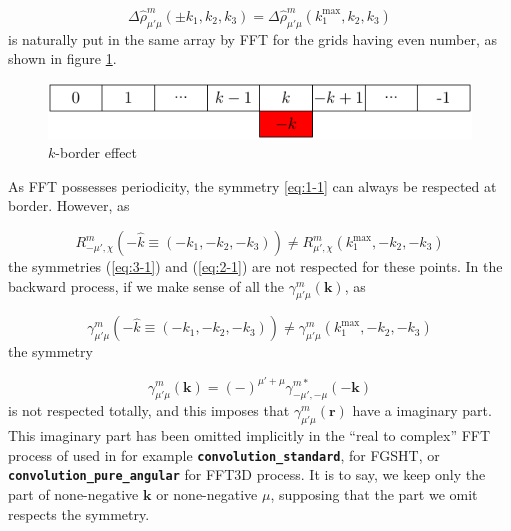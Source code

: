 \[
\Delta\hat{\rho}_{\mu'\mu}^{m}(\pm k_{1},k_{2},k_{3})=\Delta\hat{\rho}_{\mu'\mu}^{m}(k_{1}^{\mathrm{max}},k_{2},k_{3})
\]
is naturally put in the same array by FFT for the grids having even
number, as shown in figure \ref{fig:k-border-effect}. 

\begin{figure}[h]
\begin{centering}
\includegraphics{_figure/k-border}
\par\end{centering}
\caption{$k$-border effect\label{fig:k-border-effect}}
\end{figure}

As \acs{FFT} possesses periodicity, the symmetry \ref{eq:1-1} can
always be respected at border. However, as

\begin{equation}
R_{-\mu',\chi}^{m}(-\hat{k}\equiv(-k_{1},-k_{2},-k_{3}))\neq R_{\mu',\chi}^{m}(k_{1}^{\mathrm{max}},-k_{2},-k_{3})
\end{equation}
the symmetries (\ref{eq:3-1}) and (\ref{eq:2-1}) are not respected
for these points. In the backward process, if we make sense of all
the $\gamma_{\mu'\mu}^{m}(\mathbf{k})$, as

\[
\gamma_{\mu'\mu}^{m}(-\hat{k}\equiv(-k_{1},-k_{2},-k_{3}))\neq\gamma_{\mu'\mu}^{m}(k_{1}^{\mathrm{max}},-k_{2},-k_{3})
\]
the symmetry

\begin{equation}
\gamma_{\mu'\mu}^{m}(\mathbf{k})=(-)^{\mu'+\mu}\gamma_{-\mu',-\mu}^{m*}(-\mathbf{k})\label{eq:1-1}
\end{equation}
is not respected totally, and this imposes that $\gamma_{\mu'\mu}^{m}(\mathbf{r})$
have a imaginary part. This imaginary part has been omitted implicitly
in the ``real to complex'' \acs{FFT} process of used in for example
\texttt{\textbf{convolution\_standard}}, for \acs{FGSHT}, or \texttt{\textbf{convolution\_pure\_angular}}
for FFT3D process. It is to say, we keep only the part of none-negative
$\mathbf{k}$ or none-negative $\mu$, supposing that the part we
omit respects the symmetry.

